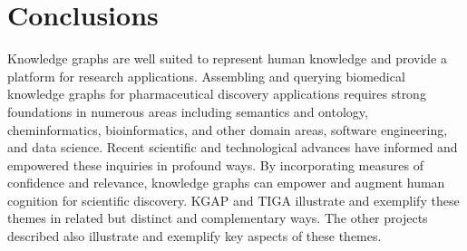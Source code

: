 \chapter{Conclusions}

Knowledge graphs are well suited to represent human knowledge and provide a platform for research applications. 
Assembling and querying biomedical knowledge graphs for pharmaceutical discovery applications requires strong foundations in numerous areas including semantics and ontology, cheminformatics, bioinformatics, and other domain areas, software engineering, and data science.
Recent scientific and technological advances have informed and empowered these inquiries in profound ways.
By incorporating measures of confidence and relevance, knowledge graphs can empower and augment human cognition for scientific discovery.
KGAP and TIGA illustrate and exemplify these themes in related but distinct and complementary ways. The other projects described also illustrate and exemplify key aspects of these themes.
